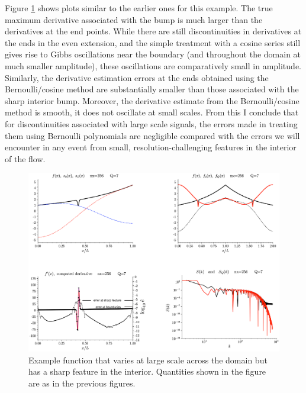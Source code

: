 \documentclass{jfm-like}
\begin{document}
Figure \ref{fig:bump} shows plots similar to the earlier ones for this example. The true maximum derivative associated with the bump is much larger than the derivatives at the end points. While there are still discontinuities
in derivatives at the ends in the even extension, and the simple treatment with a cosine series still gives rise to Gibbs oscillations near the boundary (and throughout the domain at much smaller amplitude), these oscillations
are comparatively small in amplitude. Similarly, the derivative estimation errors at the ends obtained using the Bernoulli/cosine method are substantially smaller than those associated with the sharp interior bump.
Moreover, the derivative estimate from the Bernoulli/cosine method is smooth, it does not oscillate at small scales. From this I conclude that for discontinuities associated with large scale signals, the errors made in treating them
using Bernoulli polynomials are negligible compared with the errors we will encounter in any event from small, resolution-challenging features in the interior of the flow.
 \begin{figure}
  \centerline{\includegraphics[width=1.0\textwidth]{FIGS/trig_figs/bump.eps}}
  \caption{Example function that varies at large scale across the domain but has a sharp feature in the interior. Quantities shown in the figure are as in the previous figures.}
   \label{fig:bump}
\end{figure}




\end{document}
